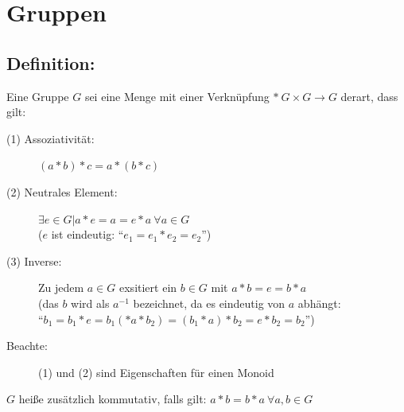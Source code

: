 \section{Gruppen}
%
%
%
\subsection{Definition:}
Eine Gruppe $G$ sei eine Menge mit einer Verknüpfung $* \ G \times G \rightarrow G$ derart, dass gilt:\\
\begin{description}
	\item[(1) Assoziativität:] $(a*b)*c = a*(b*c)$
	\item[(2) Neutrales Element:] $\exists e \in G | a*e=a=e*a \ \forall a \in G$ \\
						($e$ ist eindeutig: "`$e_{1}=e_{1}*e_{2}=e_{2}$"')
	\item[(3) Inverse:] Zu jedem $a \in G$ exsitiert ein $b \in G$ mit $a*b=e=b*a$\\
				(das $b$ wird als $a^{-1}$ bezeichnet, da es eindeutig von $a$ abhängt: \\
				"`$b_{1} = b_{1}*e=b_{1}(*a*b_{2})=(b_{1}*a)*b_{2}=e*b_{2}=b_{2}$"')
	\item[Beachte:] (1) und (2) sind Eigenschaften für einen Monoid
\end{description}
$G$ heiße zusätzlich kommutativ, falls gilt: $a*b=b*a \ \forall a,b \in G$
%
%
%
